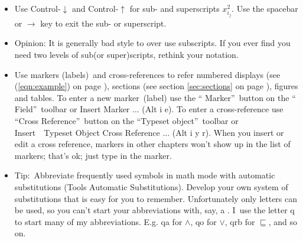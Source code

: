 \begin{itemize}
\item Use Control-$\downarrow $ and Control-$\uparrow $ for sub- and
superscripts $x_{i_{j}}^{2}$. Use the spacebar or $\rightarrow $ key to exit
the sub- or superscript.

\item Opinion: It is generally bad style to over use subscripts. If you ever
find you need two levels of sub(or super)scripts, rethink your notation.

\item Use markers (labels)\ and cross-references to refer numbered displays
(see (\ref{eqn:example}) on page \pageref{eqn:example}), sections (see
section \ref{sec:sections} on page \pageref{sec:sections}), figures and
tables. To enter a new marker\ (label) use the \textquotedblleft
Marker\textquotedblright\ button on the \textquotedblleft
Field\textquotedblright\ toolbar or Insert \TEXTsymbol{>}\TEXTsymbol{>}
Marker ... (Alt i e). To enter a cross-reference use \textquotedblleft Cross
Reference\textquotedblright\ button on the \textquotedblleft Typeset
object\textquotedblright\ toolbar or Insert\ \TEXTsymbol{>}\TEXTsymbol{>}\
Typeset Object \TEXTsymbol{>}\TEXTsymbol{>} Cross Reference ... (Alt i y r).
When you insert or edit a cross reference, markers in other chapters won't
show up in the list of markers; that's ok; just type in the marker.

\item Tip:\ Abbreviate frequently used symbols in math mode with automatic
substitutions (Tools \TEXTsymbol{>}\TEXTsymbol{>} Automatic Substitutions).
Develop your own system of substitutions that is easy for you to remember.
Unfortunately only letters can be used, so you can't start your
abbreviations with, say, a \TEXTsymbol{\backslash} . I\ use the letter q to
start many of my abbreviations. E.g. qa for $\wedge $, qo for $\vee $, qrb
for $\sqsubseteq $, and so on.


\end{itemize}
